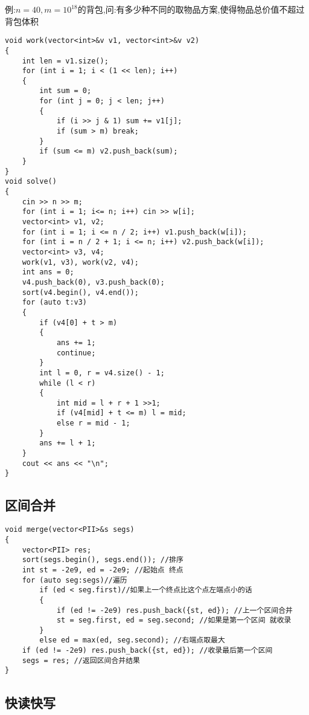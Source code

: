 \documentclass[a4paper, fontset=none]{ctexart}
\begin{document}
例:$n=40, m=10^{18}$的背包,问:有多少种不同的取物品方案,使得物品总价值不超过背包体积

\begin{verbatim}
void work(vector<int>&v v1, vector<int>&v v2)
{
    int len = v1.size();
    for (int i = 1; i < (1 << len); i++)
    {
        int sum = 0;
        for (int j = 0; j < len; j++)
        {
            if (i >> j & 1) sum += v1[j];
            if (sum > m) break;
        }
        if (sum <= m) v2.push_back(sum);
    }
}
void solve()
{
    cin >> n >> m;
    for (int i = 1; i<= n; i++) cin >> w[i];
    vector<int> v1, v2;
    for (int i = 1; i <= n / 2; i++) v1.push_back(w[i]);
    for (int i = n / 2 + 1; i <= n; i++) v2.push_back(w[i]);
    vector<int> v3, v4;
    work(v1, v3), work(v2, v4);
    int ans = 0;
    v4.push_back(0), v3.push_back(0);
    sort(v4.begin(), v4.end());
    for (auto t:v3)
    {
        if (v4[0] + t > m)
        {
            ans += 1;
            continue;
        }
        int l = 0, r = v4.size() - 1;
        while (l < r)
        {
            int mid = l + r + 1 >>1;
            if (v4[mid] + t <= m) l = mid;
            else r = mid - 1;
        }
        ans += l + 1;
    }
    cout << ans << "\n";
}
\end{verbatim}
\subsection{区间合并}

\begin{verbatim}
void merge(vector<PII>&s segs)
{
    vector<PII> res;
    sort(segs.begin(), segs.end()); //排序
    int st = -2e9, ed = -2e9; //起始点 终点
    for (auto seg:segs)//遍历
        if (ed < seg.first)//如果上一个终点比这个点左端点小的话
        {
            if (ed != -2e9) res.push_back({st, ed}); //上一个区间合并
            st = seg.first, ed = seg.second; //如果是第一个区间 就收录
        }
        else ed = max(ed, seg.second); //右端点取最大
    if (ed != -2e9) res.push_back({st, ed}); //收录最后第一个区间
    segs = res; //返回区间合并结果
}
\end{verbatim}
\subsection{快读快写}
\end{document}

